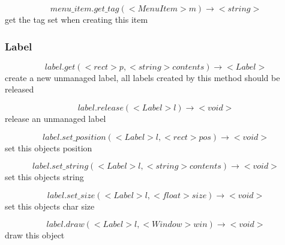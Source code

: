 \documentclass[11pt,fleqn]{book} %
\begin{document}
\begin{equation}
menu\_item.get\_tag(<MenuItem> m) \rightarrow <string>
\end{equation}
get the tag set when creating this item

\subsubsection{Label}

\begin{equation}
label.get(<rect> p, <string> contents) \rightarrow <Label>
\end{equation}
create a new unmanaged label, all labels created by this method should be released

\begin{equation}
label.release(<Label> l) \rightarrow <void>
\end{equation}
release an unmanaged label

\begin{equation}
label.set\_position(<Label> l, <rect> pos) \rightarrow <void>
\end{equation}
set this objects position

\begin{equation}
label.set\_string(<Label> l, <string> contents) \rightarrow <void>
\end{equation}
set this objects string

\begin{equation}
label.set\_size(<Label> l, <float> size) \rightarrow <void>
\end{equation}
set this objects char size

\begin{equation}
label.draw(<Label> l, <Window> win) \rightarrow <void>
\end{equation}
draw this object
\end{document}

